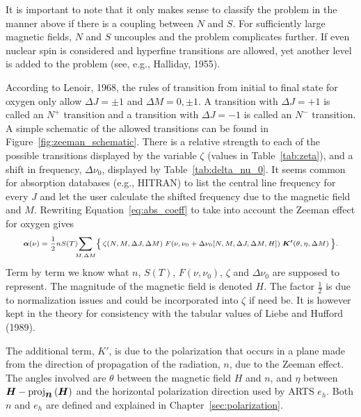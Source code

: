 It is important to note that it only makes sense to classify the problem in the manner above if there is a coupling between $N$ and $S$. For sufficiently large magnetic fields, $N$ and $S$ uncouples and the problem complicates further. If even nuclear spin is considered and hyperfine transitions are allowed, yet another level is added to the problem (see, e.g., Halliday, 1955).

According to Lenoir, 1968, the rules of transition from initial to final state for oxygen only allow $\Delta J =\pm 1$ and $\Delta M = 0, \pm 1$. A transition with $\Delta J = +1$ is called an $N^+$ transition and a transition with $\Delta J = -1$ is called an $N^-$ transition. A simple schematic of the allowed transitions can be found in Figure~\ref{fig:zeeman_schematic}. There is a relative strength to each of the possible transitions displayed by the variable $\zeta$ (values in Table~\ref{tab:zeta}), and a shift in frequency, $\Delta\nu_0$, displayed by Table~\ref{tab:delta_nu_0}. It seems common for absorption databases (e.g., HITRAN) to list the central line frequency for every $J$ and let the user calculate the shifted frequency due to the magnetic field and $M$. Rewriting Equation~\ref{eq:abs_coeff} to take into account the Zeeman effect for oxygen gives
\begin{equation}\label{eq:abs_zeeman_mat}\scriptsize
 \mbox{\boldmath${\alpha}$}(\nu)=\frac{1}{2}nS(T)\!\!\!\sum_{M,\Delta M} \Bigl\{ \, \zeta(N,M,\Delta J, \Delta M) \; F(\nu, \nu_0 + \Delta\nu_0[N,M,\Delta J, \Delta M, H]) \; \mbox{\boldmath${K}'$}(\theta, \eta,\Delta M) \, \Bigr\}.
\end{equation}
Term by term we know what $n$, $S(T)$, $F(\nu,\nu_0)$, $\zeta$ and $\Delta\nu_0$ are supposed to represent. The magnitude of the magnetic field is denoted $H$. The factor $\frac{1}{2}$ is due to normalization issues and could be incorporated into $\zeta$ if need be. It is however kept in the theory for consistency with the tabular values of Liebe and Hufford (1989). 

The additional term, {\boldmath$K'$}, is due to the polarization that occurs in a plane made from the direction of propagation of the radiation, {\boldmath$n$}, due to the Zeeman effect. The angles involved are $\theta$ between the magnetic field {\boldmath$H$} and {\boldmath$n$}, and $\eta$ between $\mbox{\boldmath$H$}-\mbox{proj}_{\mbox{\boldmath$n$}}\left(\mbox{\boldmath$H$}\right)$ and the horizontal polarization direction used by ARTS {\boldmath$e$}$_h$. Both {\boldmath$n$} and {\boldmath$e$}$_h$ are defined and explained in Chapter~\ref{sec:polarization}.

